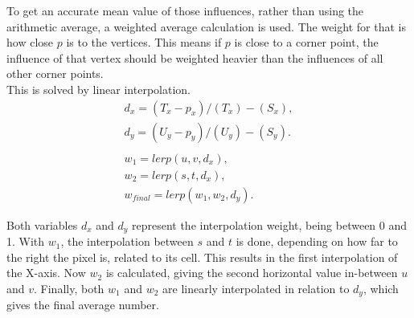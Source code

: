 \noindent
To get an accurate mean value of those influences, rather than using the arithmetic average, a weighted average calculation is used. The weight for that is how close $p$ is to the vertices.
This means if $p$ is close to a corner point, the influence of that vertex should be weighted heavier than the influences of all other corner points.
\\
This is solved by linear interpolation.
$$
\begin{array}{l}
    d_x = (T_x - p_x) / (T_x) - (S_x),\\
    d_y = (U_y - p_y) / (U_y) - (S_y).\\
    \\
    w_1 = lerp(u, v, d_x),\\
    w_2 = lerp(s, t, d_x),\\
    w_{final} = lerp(w_1, w_2, d_y).
\end{array}
$$

\noindent
Both variables $d_x$ and $d_y$ represent the interpolation weight, being between 0 and 1. With $w_1$, the interpolation between $s$ and $t$ is done, depending on how far to the right the pixel is, related to its cell.
This results in the first interpolation of the X-axis. Now $w_2$ is calculated, giving the second horizontal value in-between $u$ and $v$.
Finally, both $w_1$ and $w_2$ are linearly interpolated in relation to $d_y$, which gives the final average number.


